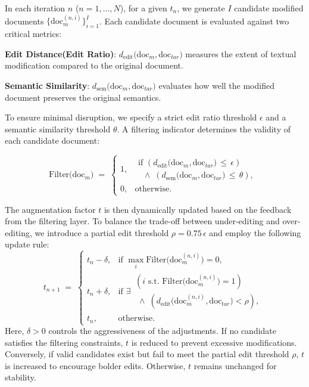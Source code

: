 In each iteration $n$ ($n=1,\dots,N$), for a given $t_n$, we generate $I$ candidate modified documents $\{\text{doc}_{m}^{(n,i)}\}_{i=1}^I$. Each candidate document is evaluated against two critical metrics:


\textbf{Edit Distance(Edit Ratio)}: $d_{\mathrm{edit}}\bigl(\text{doc}_{m}, \text{doc}_{tar}\bigr)$ measures the extent of textual modification compared to the original document.

\textbf{Semantic Similarity}: $d_{\mathrm{sem}}\bigl(\text{doc}_{m}, \text{doc}_{tar}\bigr)$ evaluates how well the modified document preserves the original semantics.


To ensure minimal disruption, we specify a strict edit ratio threshold $\epsilon$ and a semantic similarity threshold $\theta$. A filtering indicator determines the validity of each candidate document:


{\small
\[
    \mathrm{Filter}\bigl(\text{doc}_{m}\bigr) 
    \;=\; 
    \begin{cases}
        1, & \begin{matrix}
        \text{if } (d_{\mathrm{edit}}\bigl(\text{doc}_{m}, \text{doc}_{tar}\bigr)\,\le\,\epsilon ) \\
        \;\;\wedge \;(d_{\mathrm{sem}}\bigl(\text{doc}_{m}, \text{doc}_{tar}\bigr)\,\le\,\theta),
        \end{matrix} \\
        0, & \text{otherwise}.
    \end{cases}
\]
}

The augmentation factor $t$ is then dynamically updated based on the feedback from the filtering layer. To balance the trade-off between under-editing and over-editing, we introduce a partial edit threshold $\rho = 0.75\,\epsilon$ and employ the following update rule:
{\small
\[
  t_{n+1} \;=\;
  \begin{cases}
    t_n - \delta, 
      & \text{if } \max\limits_{i} \mathrm{Filter}\bigl(\text{doc}_{m}^{(n,i)}\bigr) = 0, \\[6pt]
    t_n + \delta, 
      & \text{if } \exists\,
      \begin{matrix}
          ( i \text{ s.t. } \mathrm{Filter}\bigl(\text{doc}_{m}^{(n,i)}\bigr) = 1)\\ 
          \;\wedge\;
          (d_{\mathrm{edit}}\!\bigl(\text{doc}_{m}^{(n,i)}, \text{doc}_{tar}\bigr) < \rho), \end{matrix}
          \\
        t_n, 
      & \text{otherwise}.
  \end{cases}
\]}
Here, $\delta>0$ controls the aggressiveness of the adjustments. If no candidate satisfies the filtering constraints, $t$ is reduced to prevent excessive modifications. Conversely, if valid candidates exist but fail to meet the partial edit threshold $\rho$, $t$ is increased to encourage bolder edits. Otherwise, $t$ remains unchanged for stability.


